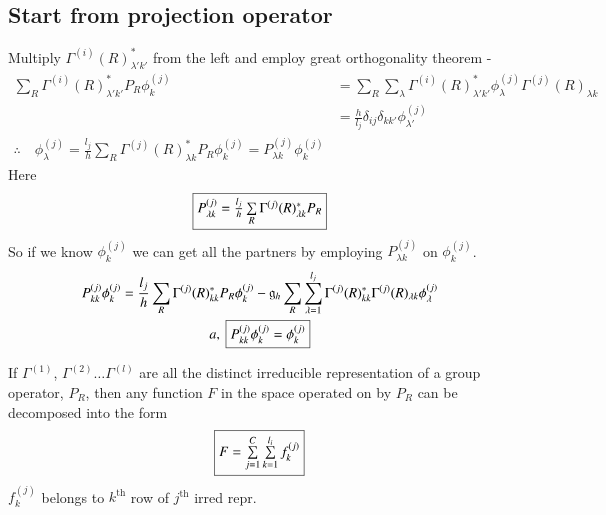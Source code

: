 \chapter{}\label{lec9}

\section*{Start from projection operator}

Multiply $\Gamma^{(i)}(R)^{*}_{\lambda'k'}$ from the left and employ great orthogonality theorem -
\begin{align*}
\sum\limits_{R}\Gamma^{(i)}(R)^{*}_{\lambda'k'}P_{R}\phi^{(j)}_{k} &= \sum\limits_{R}\sum\limits_{\lambda}\Gamma^{(i)}(R)^{*}_{\lambda'k'}\phi^{(j)}_{\lambda}\Gamma^{(j)}(R)_{\lambda k}\\
&= \frac{h}{l_{j}}\delta_{ij}\delta_{kk'}\phi^{(j)}_{\lambda'}\\
\therefore\quad \phi^{(j)}_{\lambda}=\frac{l_{j}}{h}\sum\limits_{R}\Gamma^{(j)}(R)^{*}_{\lambda k}P_{R}\phi^{(j)}_{k}=P^{(j)}_{\lambda k}\phi^{(j)}_{k}
\end{align*}
Here
$$
\fbox{$P^{(j)}_{\lambda k}=\frac{l_{j}}{h}\sum\limits_{R}\Gamma^{(j)}(R)^{*}_{\lambda k} P_{R}$}
$$
So if we know $\phi^{(j)}_{k}$ we can get all the partners by employing $P^{(j)}_{\lambda k}$ on $\phi^{(j)}_{k}$.
\begin{gather*}
P^{(j)}_{kk}\phi^{(j)}_{k}=\dfrac{l_{j}}{h}\sum\limits_{R}\Gamma^{(j)}(R)^{*}_{kk}P_{R}\phi^{(j)}_{k}-\mathfrak{g}_{h}\sum\limits_{R}\sum\limits^{l_{j}}_{\lambda=1}\Gamma^{(j)}(R)^{*}_{kk}\Gamma^{(j)}(R)_{\lambda k}\phi^{(j)}_{\lambda}\\
a, \ \fbox{$P^{(j)}_{kk}\phi^{(j)}_{k}=\phi^{(j)}_{k}$}
\end{gather*}

\begin{theorem*}
If $\Gamma^{(1)}$, $\Gamma^{(2)}\ldots \Gamma^{(l)}$ are all the distinct irreducible representation of a group operator, $P_{R}$, then any function $F$ in the space operated on by $P_{R}$ can be decomposed into the form
$$
\fbox{$F=\sum\limits^{C}_{j=1}\sum\limits^{l_{i}}_{k=1}f^{(j)}_{k}$}
$$
$f^{(j)}_{k}$ belongs to $k^{\text{th}}$ row of $j^{\text{th}}$ irred repr.
\end{theorem*}

